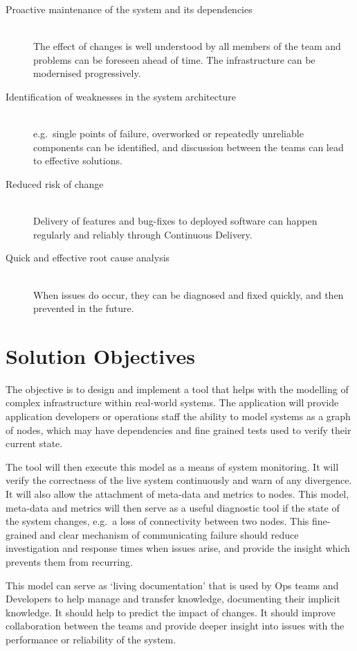 \documentclass{cshonours}
\begin{document}
\begin{description}
  \item [Proactive maintenance of the system and its dependencies]\hfill \\
    The effect of changes is well understood by all members of the team and problems can be foreseen ahead of time. The infrastructure can be modernised progressively.
  \item [Identification of weaknesses in the system architecture]\hfill \\
    e.g.\ single points of failure, overworked or repeatedly unreliable components can be identified, and discussion between the teams can lead to effective solutions. 
  \item [Reduced risk of change]\hfill \\
    Delivery of features and bug-fixes to deployed software can happen regularly and reliably through Continuous Delivery. 
  \item [Quick and effective root cause analysis]\hfill \\
    When issues do occur, they can be diagnosed and fixed quickly, and then prevented in the future.
\end{description}

\section{Solution Objectives}

The objective is to design and implement a tool that helps with the modelling of complex infrastructure within real-world systems. The application will provide application developers or operations staff the ability to model systems as a graph of nodes, which may have dependencies and fine grained tests used to verify their current state.

The tool will then execute this model as a means of system monitoring. It will verify the correctness of the live system continuously and warn of any divergence. It will also allow the attachment of meta-data and metrics to nodes. This model, meta-data and metrics will then serve as a useful diagnostic tool if the state of the system changes, e.g.\ a loss of connectivity between two nodes. This fine-grained and clear mechanism of communicating failure should reduce investigation and response times when issues arise, and provide the insight which prevents them from recurring.

This model can serve as `living documentation' that is used by Ops teams and Developers to help manage and transfer knowledge, documenting their implicit knowledge. It should help to predict the impact of changes. It should improve collaboration between the teams and provide deeper insight into issues with the performance or reliability of the system.
\end{document}
